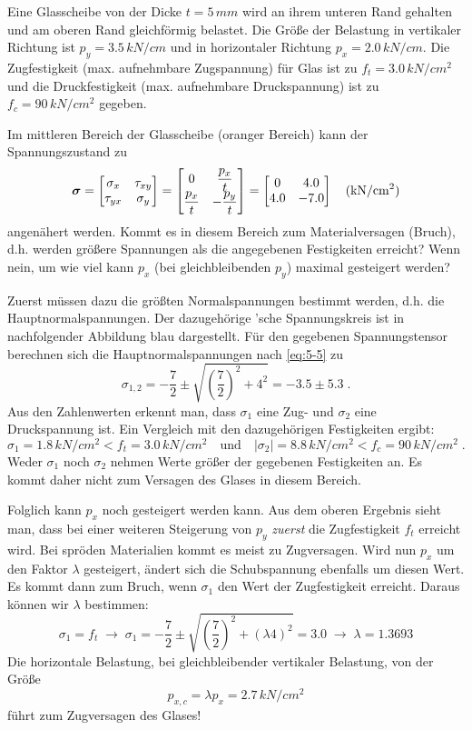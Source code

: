 \begin{example}
	Eine Glasscheibe von der Dicke $t=5\,\unit{mm}$ wird an ihrem unteren Rand gehalten und am oberen Rand gleichförmig belastet.
	Die Größe der Belastung in vertikaler Richtung ist $p_y=3.5\,\unit{kN/cm}$ und in horizontaler Richtung $p_x=2.0\,\unit{kN/cm}$.
	Die Zugfestigkeit (max. aufnehmbare Zugspannung) für Glas ist zu $f_t=3.0\,\unit{kN/cm^2}$ und die Druckfestigkeit (max. aufnehmbare Druckspannung) ist zu $f_c=90\,\unit{kN/cm^2}$ gegeben.
	\begin{center}
		
	\end{center}
	Im mittleren Bereich der Glasscheibe (oranger Bereich) kann der Spannungszustand zu
	\[
	\bs{\sigma} = \begin{bmatrix}\sigma_x & \tau_{xy} \\ \tau_{yx} & \sigma_y\end{bmatrix} = \begin{bmatrix}0 & \dfrac{p_x}{t} \\ \dfrac{p_x}{t} & -\dfrac{p_y}{t}\end{bmatrix} = \begin{bmatrix}0 & 4.0 \\ 4.0 & -7.0\end{bmatrix} \quad (\unit{kN/cm^2}) 
	\]
	angenähert werden.
	Kommt es in diesem Bereich zum Materialversagen (Bruch), d.h. werden größere Spannungen als die angegebenen Festigkeiten erreicht?
	Wenn nein, um wie viel kann $p_x$ (bei gleichbleibenden $p_y$) maximal gesteigert werden?
	
	Zuerst müssen dazu die größten Normalspannungen bestimmt werden, d.h. die Hauptnormalspannungen.
	Der dazugehörige 'sche Spannungskreis ist in nachfolgender Abbildung  blau dargestellt.
	Für den gegebenen Spannungstensor berechnen sich die Hauptnormalspannungen nach \eqref{eq:5-5} zu 
	\[
	\sigma_{1,2} = -\dfrac{7}{2}\pm\sqrt{\left(\dfrac{7}{2}\right)^2+4^2} = -3.5\pm 5.3 \; .
	\]
	Aus den Zahlenwerten erkennt man, dass $\sigma_1$ eine Zug- und $\sigma_2$ eine Druckspannung ist.
	Ein Vergleich mit den dazugehörigen Festigkeiten ergibt:
	\[
	\sigma_1 = 1.8\,\unit{kN/cm^2} < f_t=3.0\,\unit{kN/cm^2} \quad \text{und} \quad |\sigma_2| = 8.8\,\unit{kN/cm^2} < f_c=90\,\unit{kN/cm^2} \; .
	\]
	Weder $\sigma_1$ noch $\sigma_2$ nehmen Werte größer der gegebenen Festigkeiten an.
	Es kommt daher nicht zum Versagen des Glases in diesem Bereich.
	
	Folglich kann $p_x$ noch gesteigert werden kann.
	Aus dem oberen Ergebnis sieht man, dass bei einer weiteren Steigerung von $p_y$ \emph{zuerst} die Zugfestigkeit $f_t$ erreicht wird.
	Bei spröden Materialien kommt es meist zu Zugversagen.
	Wird nun $p_x$ um den Faktor $\lambda$ gesteigert, ändert sich die Schubspannung ebenfalls um diesen Wert.
	Es kommt dann zum Bruch, wenn $\sigma_1$ den Wert der Zugfestigkeit erreicht.
	Daraus können wir $\lambda$ bestimmen: 
	\[
	\sigma_1 = f_t \;\rightarrow\; \sigma_1 = -\dfrac{7}{2}\pm\sqrt{\left(\dfrac{7}{2}\right)^2+(\lambda 4)^2} = 3.0 \;\rightarrow\; \lambda = 1.3693
	\]
	Die horizontale Belastung, bei gleichbleibender vertikaler Belastung, von der Größe
	\[
	p_{x,c} = \lambda p_x= 2.7\,\unit{kN/cm^2}
	\]
	führt zum Zugversagen des Glases! 
	

\end{example}
